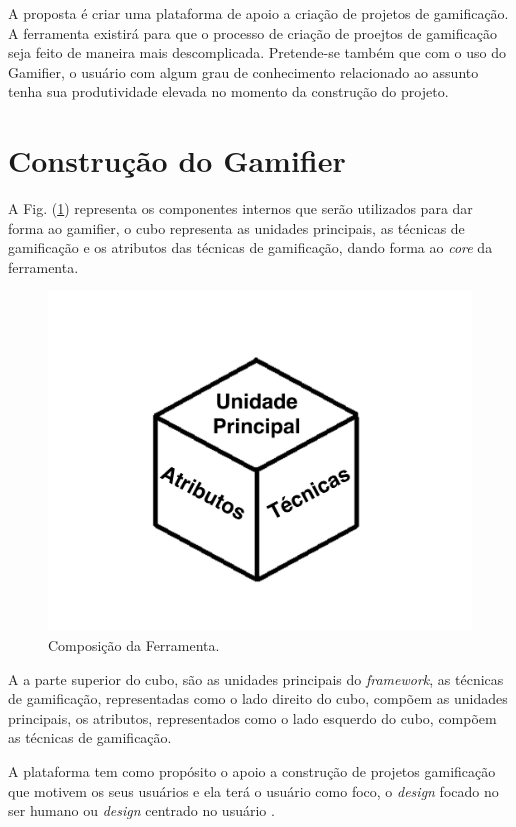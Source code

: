 A proposta é criar uma plataforma de apoio  a criação de projetos de gamificação. A ferramenta existirá para que o processo de criação de proejtos de gamificação seja feito de maneira mais descomplicada. Pretende-se também que com o uso do Gamifier, o usuário com algum grau de conhecimento relacionado ao assunto tenha sua produtividade elevada no momento da construção do projeto. 

\section{Construção do Gamifier}

A Fig. (\ref{fig01}) representa os componentes internos que serão utilizados para dar forma ao gamifier, o cubo representa as unidades principais, as técnicas de gamificação e os atributos das técnicas de gamificação, dando forma ao \textit{core} da ferramenta.

\begin{figure}[h]
	\centering
		\includegraphics[keepaspectratio=true,scale=0.5]{figuras/hcgd.png}
	\caption{Composição da Ferramenta.\label{fig01}}
\end{figure}


A a parte superior do cubo, são as unidades principais do \textit{framework}, as técnicas de gamificação, representadas como o lado direito do cubo, compõem as unidades principais, os atributos, representados como o lado esquerdo do cubo, compõem as técnicas de gamificação. 

A plataforma tem como propósito o apoio a construção de projetos gamificação que motivem os seus usuários e ela terá o usuário como foco, o \textit{design} focado no ser humano \cite{chou2015actionable} ou \textit{design}  centrado no usuário \cite{kumar2013gamification}.


